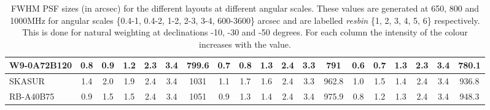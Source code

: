 \begin{table}[!htp]
{{\begin{tabular}{|lcccccc||cccccc||cccccc|}
W9-0A72B120 & 0.8 \cellcolor{blue!25.76} & 0.9 \cellcolor{red!20.92} & 1.2 \cellcolor{green!18.00} & 2.3 \cellcolor{orange!18.22} & 3.4 \cellcolor{purple!33.51} & 799.6 \cellcolor{blue!18.00} & 0.7 \cellcolor{blue!27.29} & 0.8 \cellcolor{red!18.80} & 1.3 \cellcolor{green!18.00} & 2.4 \cellcolor{orange!29.61} & 3.3 \cellcolor{purple!21.28} & 791 \cellcolor{blue!18.32} & 0.6 \cellcolor{blue!18.95} & 0.7 \cellcolor{red!18.00} & 1.3 \cellcolor{green!18.00} & 2.3 \cellcolor{orange!18.00} & 3.4 \cellcolor{purple!35.79} & 780.1 \cellcolor{blue!18.78}\\ \hline 
SKASUR & 1.4 \cellcolor{blue!60.00} & 2.0 \cellcolor{red!60.00} & 1.9 \cellcolor{green!60.00} & 2.4 \cellcolor{orange!60.00} & 3.4 \cellcolor{purple!60.00} & 1031 \cellcolor{blue!56.75} & 1.1 \cellcolor{blue!60.00} & 1.7 \cellcolor{red!60.00} & 1.6 \cellcolor{green!60.00} & 2.4 \cellcolor{orange!60.00} & 3.3 \cellcolor{purple!23.82} & 962.8 \cellcolor{blue!57.04} & 1.0 \cellcolor{blue!60.00} & 1.5 \cellcolor{red!60.00} & 1.4 \cellcolor{green!60.00} & 2.4 \cellcolor{orange!42.06} & 3.4 \cellcolor{purple!45.89} & 936.8 \cellcolor{blue!57.19}\\ \hline 
RB-A40B75 & 0.9 \cellcolor{blue!32.92} & 1.5 \cellcolor{red!43.02} & 1.5 \cellcolor{green!35.09} & 2.4 \cellcolor{orange!25.47} & 3.4 \cellcolor{purple!54.75} & 1051 \cellcolor{blue!60.00} & 0.9 \cellcolor{blue!47.15} & 1.3 \cellcolor{red!43.49} & 1.4 \cellcolor{green!30.06} & 2.4 \cellcolor{orange!53.09} & 3.4 \cellcolor{purple!60.00} & 975.9 \cellcolor{blue!60.00} & 0.8 \cellcolor{blue!44.36} & 1.2 \cellcolor{red!43.43} & 1.3 \cellcolor{green!21.94} & 2.4 \cellcolor{orange!60.00} & 3.4 \cellcolor{purple!60.00} & 948.3 \cellcolor{blue!60.00}\tabularnewline \hline 
\end{tabular}}\hfill 

\caption{FWHM PSF sizes (in arcsec) for the different layouts at different angular scales. These values are generated at 650, 800 and 1000MHz for angular scales \{0.4-1, 0.4-2, 1-2, 2-3, 3-4, 600-3600\} arcsec and are labelled {\it resbin} \{1, 2, 3, 4, 5, 6\} respectively. This is done for natural weighting at declinations -10, -30 and -50 degrees. For each column the intensity of the colour increases with the value.}\label{tab:psf_mean-new}}
 \end{table}